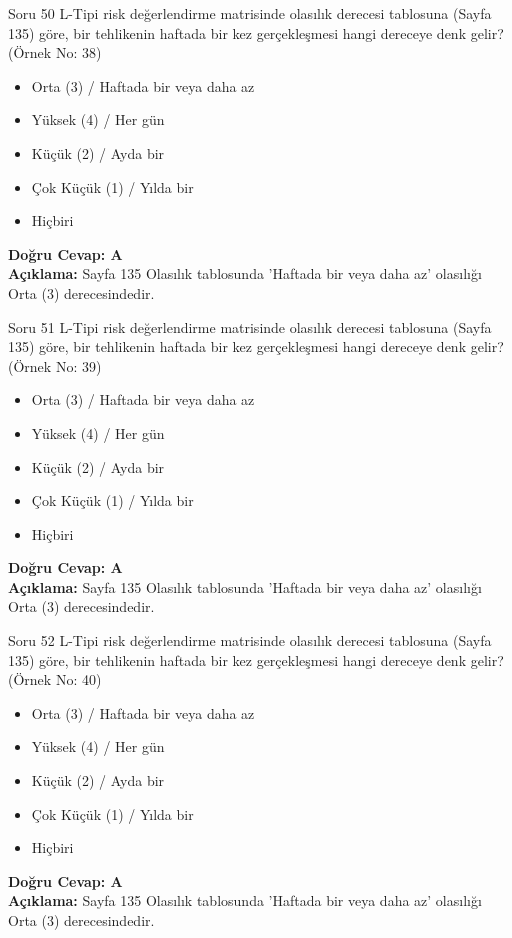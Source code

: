 \documentclass[12pt,a4paper]{article}
\begin{document}
\begin{testcard}{Soru 50}
    L-Tipi risk değerlendirme matrisinde olasılık derecesi tablosuna (Sayfa 135) göre, bir tehlikenin haftada bir kez gerçekleşmesi hangi dereceye denk gelir? (Örnek No: 38)
    \begin{itemize}
        \item[A)] Orta (3) / Haftada bir veya daha az
        \item[B)] Yüksek (4) / Her gün
        \item[C)] Küçük (2) / Ayda bir
        \item[D)] Çok Küçük (1) / Yılda bir
        \item[E)] Hiçbiri
    \end{itemize}
    \tcblower
    \textbf{Doğru Cevap: A} \\
    \textbf{Açıklama:} Sayfa 135 Olasılık tablosunda 'Haftada bir veya daha az' olasılığı Orta (3) derecesindedir.
\end{testcard}

\begin{testcard}{Soru 51}
    L-Tipi risk değerlendirme matrisinde olasılık derecesi tablosuna (Sayfa 135) göre, bir tehlikenin haftada bir kez gerçekleşmesi hangi dereceye denk gelir? (Örnek No: 39)
    \begin{itemize}
        \item[A)] Orta (3) / Haftada bir veya daha az
        \item[B)] Yüksek (4) / Her gün
        \item[C)] Küçük (2) / Ayda bir
        \item[D)] Çok Küçük (1) / Yılda bir
        \item[E)] Hiçbiri
    \end{itemize}
    \tcblower
    \textbf{Doğru Cevap: A} \\
    \textbf{Açıklama:} Sayfa 135 Olasılık tablosunda 'Haftada bir veya daha az' olasılığı Orta (3) derecesindedir.
\end{testcard}

\begin{testcard}{Soru 52}
    L-Tipi risk değerlendirme matrisinde olasılık derecesi tablosuna (Sayfa 135) göre, bir tehlikenin haftada bir kez gerçekleşmesi hangi dereceye denk gelir? (Örnek No: 40)
    \begin{itemize}
        \item[A)] Orta (3) / Haftada bir veya daha az
        \item[B)] Yüksek (4) / Her gün
        \item[C)] Küçük (2) / Ayda bir
        \item[D)] Çok Küçük (1) / Yılda bir
        \item[E)] Hiçbiri
    \end{itemize}
    \tcblower
    \textbf{Doğru Cevap: A} \\
    \textbf{Açıklama:} Sayfa 135 Olasılık tablosunda 'Haftada bir veya daha az' olasılığı Orta (3) derecesindedir.
\end{testcard}
\end{document}
